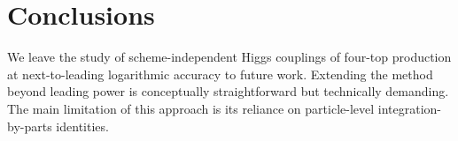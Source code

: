 \section{Conclusions}\label{sec:conclusions}

We leave the study of scheme-independent Higgs couplings of four-top
production at next-to-leading logarithmic accuracy to future work.
Extending the method beyond leading power is conceptually
straightforward but technically demanding. The main limitation of this
approach is its reliance on particle-level integration-by-parts
identities.

